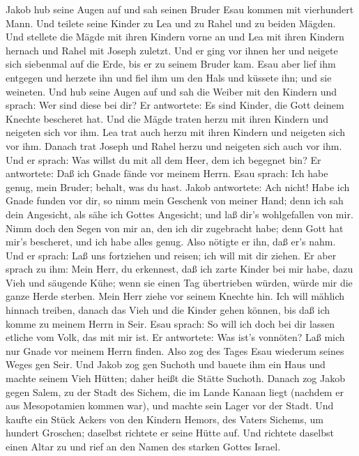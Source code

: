  Jakob hub seine Augen auf und sah seinen Bruder Esau kommen
mit vierhundert Mann. Und teilete seine Kinder zu Lea und zu Rahel und
zu beiden Mägden.  Und stellete die Mägde mit ihren Kindern
vorne an und Lea mit ihren Kindern hernach und Rahel mit Joseph zuletzt.
 Und er ging vor ihnen her und neigete sich siebenmal auf
die Erde, bis er zu seinem Bruder kam.  Esau aber lief ihm
entgegen und herzete ihn und fiel ihm um den Hals und küssete ihn; und
sie weineten.  Und hub seine Augen auf und sah die Weiber
mit den Kindern und sprach: Wer sind diese bei dir? Er antwortete: Es
sind Kinder, die Gott deinem Knechte bescheret hat.  Und die
Mägde traten herzu mit ihren Kindern und neigeten sich vor ihm.
 Lea trat auch herzu mit ihren Kindern und neigeten sich vor
ihm. Danach trat Joseph und Rahel herzu und neigeten sich auch vor ihm.
 Und er sprach: Was willst du mit all dem Heer, dem ich
begegnet bin? Er antwortete: Daß ich Gnade fände vor meinem Herrn.
 Esau sprach: Ich habe genug, mein Bruder; behalt, was du
hast.  Jakob antwortete: Ach nicht! Habe ich Gnade funden
vor dir, so nimm mein Geschenk von meiner Hand; denn ich sah dein
Angesicht, als sähe ich Gottes Angesicht; und laß dir's wohlgefallen von
mir.  Nimm doch den Segen von mir an, den ich dir
zugebracht habe; denn Gott hat mir's bescheret, und ich habe alles
genug. Also nötigte er ihn, daß er's nahm.  Und er sprach:
Laß uns fortziehen und reisen; ich will mit dir ziehen.  Er
aber sprach zu ihm: Mein Herr, du erkennest, daß ich zarte Kinder bei
mir habe, dazu Vieh und säugende Kühe; wenn sie einen Tag übertrieben
würden, würde mir die ganze Herde sterben.  Mein Herr ziehe
vor seinem Knechte hin. Ich will mählich hinnach treiben, danach das
Vieh und die Kinder gehen können, bis daß ich komme zu meinem Herrn in
Seir.  Esau sprach: So will ich doch bei dir lassen etliche
vom Volk, das mit mir ist. Er antwortete: Was ist's vonnöten? Laß mich
nur Gnade vor meinem Herrn finden.  Also zog des Tages Esau
wiederum seines Weges gen Seir.  Und Jakob zog gen Suchoth
und bauete ihm ein Haus und machte seinem Vieh Hütten; daher heißt die
Stätte Suchoth.  Danach zog Jakob gegen Salem, zu der Stadt
des Sichem, die im Lande Kanaan liegt (nachdem er aus Mesopotamien
kommen war), und machte sein Lager vor der Stadt.  Und
kaufte ein Stück Ackers von den Kindern Hemors, des Vaters Sichems, um
hundert Groschen; daselbst richtete er seine Hütte auf. 
Und richtete daselbst einen Altar zu und rief an den Namen des starken
Gottes Israel.

